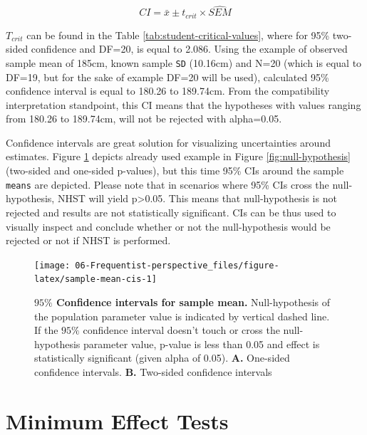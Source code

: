 \documentclass[
]{book}
\begin{document}
\begin{equation}
  CI = \bar{x} \pm t_{crit} \times \widehat{SEM} 
  \label{eq:ci-equation}
\end{equation}

\(T_{crit}\) can be found in the Table \ref{tab:student-critical-values}, where for 95\% two-sided confidence and DF=20, is equal to 2.086. Using the example of observed sample mean of 185cm, known sample \texttt{SD} (10.16cm) and N=20 (which is equal to DF=19, but for the sake of example DF=20 will be used), calculated 95\% confidence interval is equal to 180.26 to 189.74cm. From the compatibility interpretation standpoint, this CI means that the hypotheses with values ranging from 180.26 to 189.74cm, will not be rejected with alpha=0.05.

Confidence intervals are great solution for visualizing uncertainties around estimates. Figure \ref{fig:sample-mean-cis} depicts already used example in Figure \ref{fig:null-hypothesis} (two-sided and one-sided p-values), but this time 95\% CIs around the sample \texttt{means} are depicted. Please note that in scenarios where 95\% CIs cross the null-hypothesis, NHST will yield p\textgreater0.05. This means that null-hypothesis is not rejected and results are not statistically significant. CIs can be thus used to visually inspect and conclude whether or not the null-hypothesis would be rejected or not if NHST is performed.

\begin{figure}

{\centering \texttt{[image: 06-Frequentist-perspective\_files/figure-latex/sample-mean-cis-1]} 

}

\caption{\textbf{\(95\%\) Confidence intervals for sample mean.} Null-hypothesis of the population parameter value is indicated by vertical dashed line. If the \(95\%\) confidence interval doesn't touch or cross the null-hypothesis parameter value, p-value is less than 0.05 and effect is statistically significant (given alpha of 0.05). \textbf{A.} One-sided confidence intervals. \textbf{B.} Two-sided confidence intervals}\label{fig:sample-mean-cis}
\end{figure}



\hypertarget{minimum-effect-tests}{%
\section{Minimum Effect Tests}\label{minimum-effect-tests}}
\end{document}
